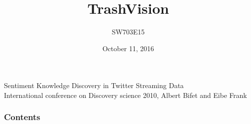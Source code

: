 \documentclass[12pt, hyperref={bookmarks=false}, show notes]{beamer}
\date{October 11, 2016}
\begin{document}

\title[Sentiment Knowledge Discovery in Twitter
Streaming Data]{TrashVision}
\author[\insertframenumber /\inserttotalframenumber]{SW703E15}

\begin{frame}
\Huge Sentiment Knowledge Discovery in Twitter
Streaming Data\\
\small International conference on Discovery science 2010, Albert Bifet and Eibe Frank\\
\end{frame}

\begin{frame}
  \frametitle{Contents}
  \tableofcontents
\end{frame}







\section*{}
\end{document}
